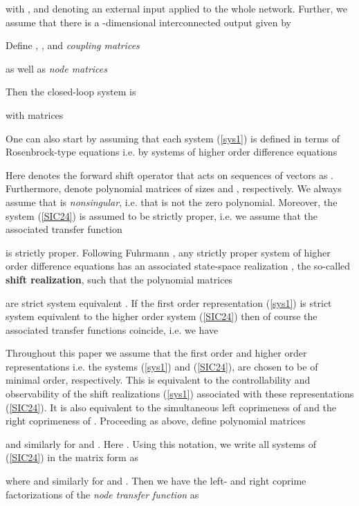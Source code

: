 \documentclass[twocolumn]{autart}    \usepackage{amsmath}
\begin{document}
with ,   and  denoting an external input
applied  to the whole
network. Further, we assume that there is a -dimensional interconnected output  given by

Define ,
, 
and \textit{coupling matrices}

as well as \textit{node matrices}


Then the closed-loop system is

with matrices






One can also start by assuming that each  system (\ref{sys1}) is defined in terms of Rosenbrock-type equations \cite{Rosenbrock1970} i.e. by systems of higher order
difference equations


Here  denotes the forward shift operator that acts on
sequences of vectors  as . Furthermore,  denote polynomial matrices of
sizes  and , respectively. We always assume  that  is  \textit{nonsingular},
i.e. that  is not the zero polynomial. Moreover, the
system (\ref{SIC24}) is assumed to be strictly proper, i.e. we assume
that the associated transfer function

is strictly proper.  Following Fuhrmann \cite{Fuhrmann1977}, any
strictly proper system of higher order
difference equations has an associated state-space realization
, the so-called \textbf{shift realization}, such that
the polynomial matrices

 are strict system equivalent \cite{Fuhrmann1977}. If the  first order representation (\ref{sys1}) is strict
system equivalent to the higher order system (\ref{SIC24}) then of
course the associated transfer functions coincide, i.e. we have



Throughout this paper we assume that the first order and higher
order representations  i.e. the  systems (\ref{sys1}) and (\ref{SIC24}),  are chosen to be of minimal
order, respectively. This is equivalent to the controllability and
observability of the shift realizations (\ref{sys1}) associated with
these representations (\ref{SIC24}). It is also equivalent to the  simultaneous left coprimeness
of  and the right coprimeness of .
Proceeding as above, define polynomial matrices

and similarly for  and . Here .
Using this  notation,    we  write all  systems of  (\ref{SIC24})  in the  matrix form as

where  and similarly for  and .
Then we have the left- and right coprime factorizations of the
  {\it
  node transfer function} as
 
\end{document}
